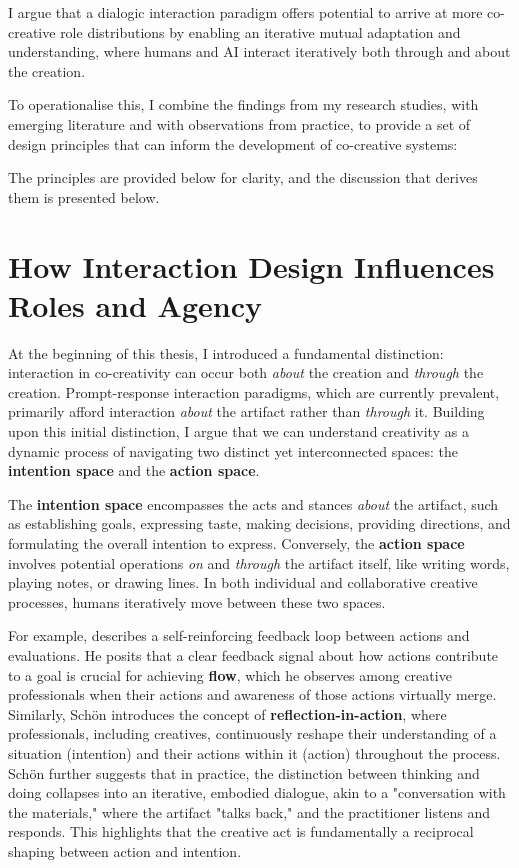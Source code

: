 I argue that a dialogic interaction paradigm offers potential to arrive at more co-creative role distributions by enabling an iterative mutual adaptation and understanding, where humans and AI interact iteratively both through and about the creation.

To operationalise this, I combine the findings from my research studies, with emerging literature and with observations from practice, to provide a set of design principles that can inform the development of co-creative systems:

The principles are provided below for clarity, and the discussion that derives them is presented below.


\section{How Interaction Design Influences Roles and Agency}

At the beginning of this thesis, I introduced a fundamental distinction: interaction in co-creativity can occur both \textit{about} the creation and \textit{through} the creation. Prompt-response interaction paradigms, which are currently prevalent, primarily afford interaction \textit{about} the artifact rather than \textit{through} it. Building upon this initial distinction, I argue that we can understand creativity as a dynamic process of navigating two distinct yet interconnected spaces: the \textbf{intention space} and the \textbf{action space}.

The \textbf{intention space} encompasses the acts and stances \textit{about} the artifact, such as establishing goals, expressing taste, making decisions, providing directions, and formulating the overall intention to express. Conversely, the \textbf{action space} involves potential operations \textit{on} and \textit{through} the artifact itself, like writing words, playing notes, or drawing lines. In both individual and collaborative creative processes, humans iteratively move between these two spaces.

For example, \cite{Csikszentmihalyi1997-ui} describes a self-reinforcing feedback loop between actions and evaluations. He posits that a clear feedback signal about how actions contribute to a goal is crucial for achieving \textbf{flow}, which he observes among creative professionals when their actions and awareness of those actions virtually merge. Similarly, Schön \cite{Schon1987-fy} introduces the concept of \textbf{reflection-in-action}, where professionals, including creatives, continuously reshape their understanding of a situation (intention) and their actions within it (action) throughout the process. Schön \cite{Schon1992-jt} further suggests that in practice, the distinction between thinking and doing collapses into an iterative, embodied dialogue, akin to a "conversation with the materials," where the artifact "talks back," and the practitioner listens and responds. This highlights that the creative act is fundamentally a reciprocal shaping between action and intention.

